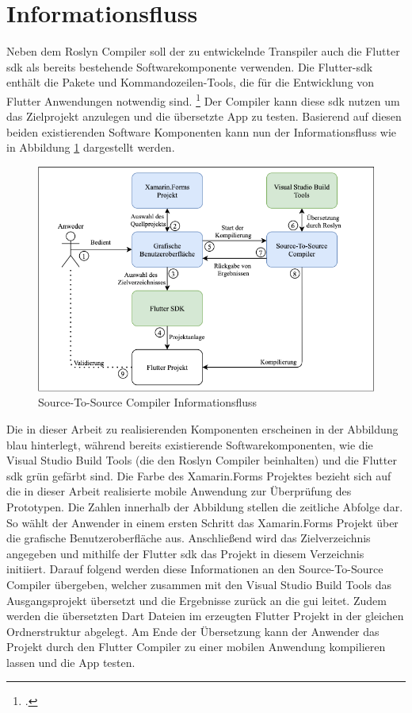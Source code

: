 \section{Informationsfluss}
Neben dem Roslyn Compiler soll der zu entwickelnde Transpiler auch die Flutter \ac{sdk}  als bereits bestehende Softwarekomponente verwenden.  Die Flutter-\ac{sdk} enthält die Pakete und Kommandozeilen-Tools,  die für die Entwicklung von Flutter Anwendungen notwendig sind.  \footcite[Vgl.][Abgerufen am \today]{GoogleFlutterSDK} Der Compiler kann diese \ac{sdk} nutzen um das Zielprojekt anzulegen und die übersetzte App zu testen.  Basierend auf diesen beiden existierenden Software Komponenten kann nun der Informationsfluss wie in Abbildung \ref{fig:Informationflow} dargestellt werden. 

\begin{figure}[!ht]
 \includegraphics[width=\textwidth,keepaspectratio]{Images/Implementation/IDE.png}
 \caption{Source-To-Source Compiler Informationsfluss}
 \label{fig:Informationflow}
\end{figure}

Die in dieser Arbeit zu realisierenden Komponenten erscheinen in der Abbildung blau hinterlegt,  während bereits existierende Softwarekomponenten, wie die \glq Visual Studio Build Tools\grq{} (die den Roslyn Compiler beinhalten) und die Flutter \ac{sdk} grün gefärbt sind.  Die Farbe des Xamarin.Forms Projektes bezieht sich auf die in dieser Arbeit realisierte mobile Anwendung zur Überprüfung des Prototypen.  Die Zahlen innerhalb der Abbildung stellen die zeitliche Abfolge dar.  So wählt der Anwender in einem ersten Schritt das Xamarin.Forms Projekt über die grafische Benutzeroberfläche aus.  Anschließend wird das Zielverzeichnis angegeben und mithilfe der Flutter \ac{sdk} das Projekt in diesem Verzeichnis initiiert.  Darauf folgend werden diese Informationen an den Source-To-Source Compiler übergeben, welcher zusammen mit den Visual Studio Build Tools das Ausgangsprojekt übersetzt und die Ergebnisse zurück an die \ac{gui} leitet.  Zudem werden die übersetzten Dart Dateien im erzeugten Flutter Projekt in der gleichen Ordnerstruktur abgelegt.  Am Ende der Übersetzung kann der Anwender das Projekt durch den Flutter Compiler zu einer mobilen Anwendung kompilieren lassen und die App testen.
